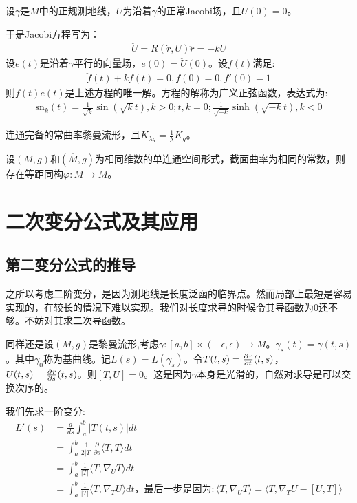 设$\gamma$是$M$中的正规测地线，$U$为沿着$\gamma$的正常Jacobi场，且$U(0)=0$。

于是Jacobi方程写为：
\begin{align}
    \ddot{U}=R(\dot{r},U)\ddot{r}=-kU 
\end{align}
设$e(t)$是沿着$\gamma$平行的向量场，$e(0)=\ddot{U}(0)$。设$f(t)$满足:
\begin{align}
    \ddot{f}(t)+kf(t)=0, f(0)=0,f'(0)=1
\end{align}
则$f(t)e(t)$是上述方程的唯一解。方程的解称为广义正弦函数，表达式为:
\begin{align*}
    \mathrm{sn}_k(t)=\frac{1}{\sqrt{k}}\sin(\sqrt{k}t),k>0;t,k=0;\frac{1}{\sqrt{-k}}\sinh (\sqrt{-k}t),k<0
\end{align*}

\begin{definition}[空间形式]
    连通完备的常曲率黎曼流形，且$K_{\lambda g}=\frac{1}{\lambda}K_g$。
\end{definition}
\begin{theorem}
    设$(M,g)$和$(\overline{M},\overline{g})$为相同维数的单连通空间形式，截面曲率为相同的常数，则存在等距同构$\varphi:M \to \overline{M}$。
\end{theorem}
\section{二次变分公式及其应用}
\subsection{第二变分公式的推导}
之所以考虑二阶变分，是因为测地线是长度泛函的临界点。然而局部上最短是容易实现的，在较长的情况下难以实现。我们对长度求导的时候令其导函数为$0$还不够。不妨对其求二次导函数。

同样还是设$(M,g)$是黎曼流形,考虑$\gamma:[a,b]\times (-\epsilon,\epsilon) \to M$。$\gamma_s(t)=\gamma(t,s)$。其中$\gamma_0$称为基曲线。记$L(s)=L(\gamma_s)$。令$T(t,s)=\frac{\partial^{} r}{\partial {t}^{}}(t,s)$，$U(t,s)=\frac{\partial^{} r}{\partial {s}^{}}(t,s)$。则$[T,U]=0$。这是因为$\gamma$本身是光滑的，自然对求导是可以交换次序的。

我们先求一阶变分:
\begin{align*}
    L'(s)&=\frac{d}{ds}\int_a^b |T(t,s)|dt \\&=\int_a^b \frac{1}{2|T|}\frac{\partial}{\partial s}\langle T,T\rangle dt\\&=\int_a^b \frac{1}{|T|}\langle T,\nabla_U T\rangle dt\\&=\int_a^b \frac{1}{|T|}\langle T ,\nabla_T U\rangle dt \text{，最后一步是因为}:\langle T,\nabla_U T\rangle=\langle T,\nabla_T U-[U,T] \rangle
\end{align*}


